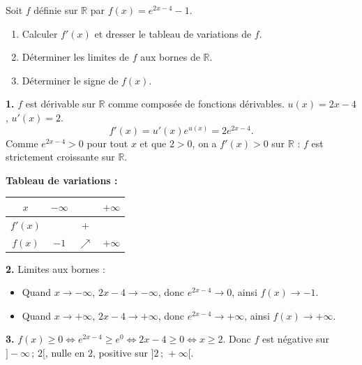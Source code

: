 \documentclass[11pt]{article}
\begin{document}
\begin{exoresolu}
Soit $f$ définie sur $\mathbb{R}$ par $f(x) = e^{2x-4} - 1$.
\begin{enumerate}
\item Calculer $f'(x)$ et dresser le tableau de variations de $f$.
\item Déterminer les limites de $f$ aux bornes de $\mathbb{R}$.
\item Déterminer le signe de $f(x)$.
\end{enumerate}
\tcblower
\textbf{1.} $f$ est dérivable sur $\mathbb{R}$ comme composée de fonctions dérivables. $u(x)=2x-4$, $u'(x)=2$.
\[ f'(x) = u'(x) e^{u(x)} = 2e^{2x-4}. \]
Comme $e^{2x-4} > 0$ pour tout $x$ et que $2 > 0$, on a $f'(x) > 0$ sur $\mathbb{R}$ : $f$ est strictement croissante sur $\mathbb{R}$.

\textbf{Tableau de variations :}
\begin{center}
\begin{tabular}{|c|ccc|}\hline
$x$ & $-\infty$ & & $+\infty$ \\ \hline
$f'(x)$ & & $+$ & \\ \hline
$f(x)$ & $-1$ & $\nearrow$ & $+\infty$ \\ \hline
\end{tabular}
\end{center}

\textbf{2.} Limites aux bornes :
\begin{itemize}
\item Quand $x \to -\infty$, $2x-4 \to -\infty$, donc $e^{2x-4} \to 0$, ainsi $f(x) \to -1$.
\item Quand $x \to +\infty$, $2x-4 \to +\infty$, donc $e^{2x-4} \to +\infty$, ainsi $f(x) \to +\infty$.
\end{itemize}

\textbf{3.} $f(x) \geq 0 \iff e^{2x-4} \geq e^{0} \iff 2x - 4 \geq 0 \iff x \geq 2$.
Donc $f$ est négative sur $]-\infty\,;\,2[$, nulle en $2$, positive sur $]2\,;\,+\infty[$.
\end{exoresolu}
\end{document}
